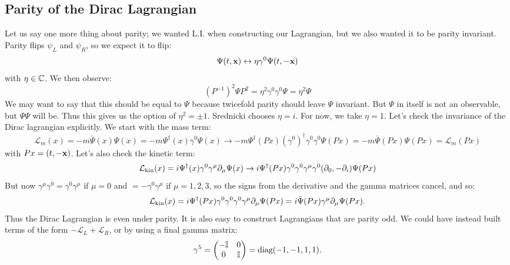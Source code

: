 \subsection{Parity of the Dirac Lagrangian}
Let us say one more thing about parity; we wanted L.I. when constructing our Lagrangian, but we also wanted it to be parity invariant. Parity flips $\psi_L$ and $\psi_R$, so we expect it to flip:
\begin{equation}
    \Psi(t, \mathbf{x}) \leftrightarrow \eta\gamma^0\Psi(t, -\mathbf{x})
\end{equation}
with $\eta \in \mathbb{C}$. We then observe:
\begin{equation}
    (P^{-1})^2\Psi P^2 = \eta^2 \gamma^0 \gamma^0 \Psi = \eta^2 \Psi
\end{equation}
We may want to say that this should be equal to $\Psi$ because twicefold parity should leave $\Psi$ invariant. But $\Psi$ in itself is not an observable, but $\Psi\Psi$ will be. Thus this gives us the option of $\eta^2 = \pm 1$. Srednicki chooses $\eta = i$. For now, we take $\eta = 1$. Let's check the invariance of the Dirac lagrangian explicitly. We start with the mass term:
\begin{equation}
    \mathcal{L}_m(x) = -m\bar{\Psi}(x)\Psi(x) = -m\Psi^\dag(x) \gamma^0 \Psi(x) \to -m\Psi^\dag(Px) (\gamma^0)^\dag \gamma^0 \gamma^0 \Psi(Px) = -m\bar{\Psi}(Px)\Psi(Px) = \mathcal{L}_m(Px)
\end{equation}
with $Px = (t, -\mathbf{x})$. Let's also check the kinetic term:
\begin{equation}
    \mathcal{L}_{\text{kin}}(x) = i\Psi^\dagger(x) \gamma^0\gamma^\mu \partial_\mu \Psi(x) \to i\Psi^\dagger(Px)\gamma^0 \gamma^0 \gamma^\mu \gamma^0 (\partial_0, -\partial_i)\Psi(Px)
\end{equation}
But now $\gamma^\mu \gamma^0 = \gamma^0 \gamma^\mu$ if $\mu = 0$ and $= -\gamma^0 \gamma^\mu$ if $\mu = 1, 2, 3$, so the signs from the derivative and the gamma matrices cancel, and so:
\begin{equation}
    \mathcal{L}_{\text{kin}}(x) = i\Psi^\dagger(Px)\gamma^0\gamma^0\gamma^0\gamma^\mu \partial_\mu \Psi(Px) = i\bar{\Psi}(Px)\gamma^\mu \partial_\mu\Psi(Px).
\end{equation}
Thus the Dirac Lagrangian is even under parity. It is also easy to construct Lagrangians that are parity odd. We could have instead built terms of the form $-\mathcal{L}_L + \mathcal{L}_R$, or by using a final gamma matrix:
\begin{equation}
    \gamma^5 = \begin{pmatrix}-\mathbb{I} & 0 \\ 0 & \mathbb{I}\end{pmatrix} = \text{diag}(-1, -1, 1, 1).
\end{equation}
